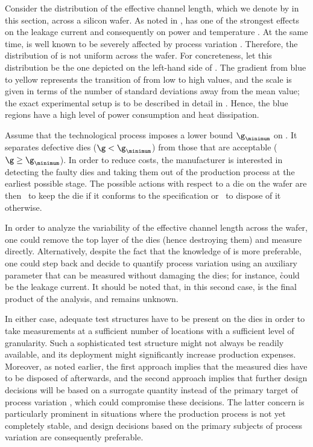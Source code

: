 Consider the distribution of the effective channel length, which we denote by \g
in this section, across a silicon wafer. As noted in , \g has
one of the strongest effects on the leakage current and consequently on power
and temperature \cite{juan2012}. At the same time, \g is well known to be
severely affected by process variation \cite{chandrakasan2000, srivastava2010}.
Therefore, the distribution of \g is not uniform across the wafer. For
concreteness, let this distribution be the one depicted on the left-hand side of
. The gradient from blue to yellow
represents the transition of \g from low to high values, and the scale is given
in terms of the number of standard deviations away from the mean value; the
exact experimental setup is to be described in detail in .
Hence, the blue regions have a high level of power consumption and heat
dissipation.

Assume that the technological process imposes a lower bound $\g_\minimum$ on \g.
It separates defective dies ($\g < \g_\minimum$) from those that are acceptable
($\g \geq \g_\minimum$). In order to reduce costs, the manufacturer is
interested in detecting the faulty dies and taking them out of the production
process at the earliest possible stage. The possible actions with respect to a
die on the wafer are then \one~to keep the die if it conforms to the
specification or \two~to dispose of it otherwise.

In order to analyze the variability of the effective channel length \g across
the wafer, one could remove the top layer of the dies (hence destroying them)
and measure \g directly. Alternatively, despite the fact that the knowledge of
\g is more preferable, one could step back and decide to quantify process
variation using an auxiliary parameter \h that can be measured without damaging
the dies; for instance, \h could be the leakage current. It should be noted
that, in this second case, \h is the final product of the analysis, and \g
remains unknown.

In either case, adequate test structures have to be present on the dies in order
to take measurements at a sufficient number of locations with a sufficient level
of granularity. Such a sophisticated test structure might not always be readily
available, and its deployment might significantly increase production expenses.
Moreover, as noted earlier, the first approach implies that the measured dies
have to be disposed of afterwards, and the second approach implies that further
design decisions will be based on a surrogate quantity \h instead of the primary
target of process variation \g, which could compromise these decisions. The
latter concern is particularly prominent in situations where the production
process is not yet completely stable, and design decisions based on the primary
subjects of process variation are consequently preferable.


